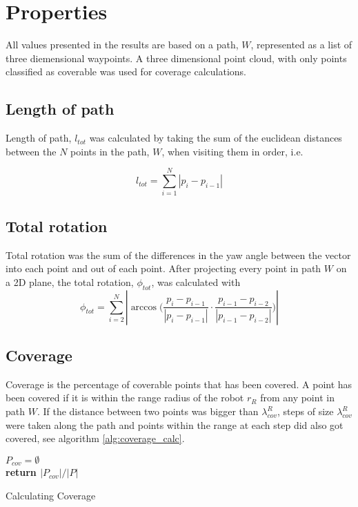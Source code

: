 \section{Properties}
\label{sec:properties} 

All values presented in the results are based on a path, $W$, represented as a list of three diemensional waypoints. A three dimensional point cloud, with only points classified as coverable was used for coverage calculations.

\subsection{Length of path}
Length of path, $l_{tot}$ was calculated by taking the sum of the euclidean distances between the $N$ points in the path, $W$, when visiting them in order, i.e.

$$
l_{tot} = \sum^N_{i=1}{|p_i - p_{i-1}|}
$$


\subsection{Total rotation}
Total rotation was the sum of the differences in the yaw angle between the vector into each point and out of each point. After projecting every point in path $W$ on a 2D plane, the total rotation, $\phi_{tot}$, was calculated with
$$
\phi_{tot} = \sum^N_{i=2}{|\arccos{(\frac{p_i-p_{i-1}}{|p_i-p_{i-1}|} \cdot \frac{p_{i-1}-p_{i-2}}{|p_{i-1}-p_{i-2}|}})|}
$$

\subsection{Coverage}
Coverage is the percentage of coverable points that has been covered. A point has been covered if it is within the range radius of the robot $r_R$ from any point in path $W$. If the distance between two points was bigger than $\lambda^R_{cov}$, steps of size $\lambda^R_{cov}$ were taken along the path and points within the range at each step did also got covered, see algorithm  \ref{alg:coverage_calc}.

\begin{algorithm}[H]
\SetAlgoLined
{}
$P_{cov} = \emptyset$ \\
\textup{\textbf{return $|P_{cov}|/|P|$}}
 \caption{Calculating Coverage}
 \label{alg:coverage_calc}
\end{algorithm}
